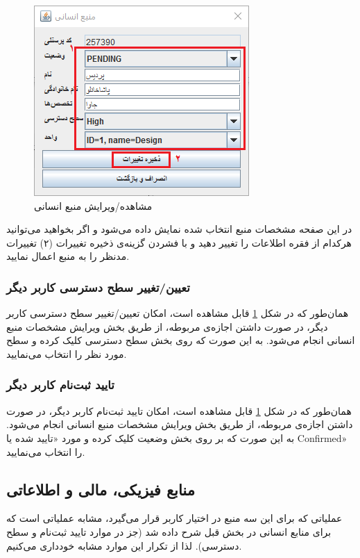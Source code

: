	\begin{figure}[H]
		\centering
		\includegraphics[scale=0.9]{img/manual/editHRess}
		\caption{مشاهده/ویرایش منبع انسانی}
		\label{f20}
	\end{figure} 
در این صفحه مشخصات منبع انتخاب شده نمایش داده می‌شود و اگر بخواهید می‌توانید هرکدام از فقره اطلاعات را تغییر دهید و با فشردن گزینه‌ی ذخیره تغییرات (۲) تغییرات مدنظر را به منبع اعمال نمایید.

\subsubsection{تعیین/تغییر سطح دسترسی کاربر دیگر}
همان‌طور که در شکل
\ref{f20}
قابل مشاهده است، امکان تعیین/تغییر سطح دسترسی کاربر دیگر، در صورت داشتن اجازه‌ی مربوطه، از طریق بخش ویرایش مشخصات منبع انسانی انجام می‌شود. به این صورت که روی بخش سطح دسترسی کلیک کرده و سطح مورد نظر را انتخاب می‌نمایید.

\subsubsection{تایید ثبت‌نام کاربر دیگر}
همان‌طور که در شکل
\ref{f20}
قابل مشاهده است، امکان تایید ثبت‌نام کاربر دیگر، در صورت داشتن اجازه‌ی مربوطه، از طریق بخش ویرایش مشخصات منبع انسانی انجام می‌شود. به این صورت که بر روی بخش وضعیت کلیک کرده و مورد «تایید شده یا Confirmed» را انتخاب می‌نمایید.


\subsection{منابع فیزیکی، مالی و اطلاعاتی}
عملیاتی که برای این سه منبع در اختیار کاربر قرار می‌گیرد، مشابه عملیاتی است که برای منابع انسانی در بخش قبل شرح داده شد (جز در موارد تایید ثبت‌نام و سطح دسترسی).   لذا از تکرار این موارد مشابه خودداری می‌کنیم.

